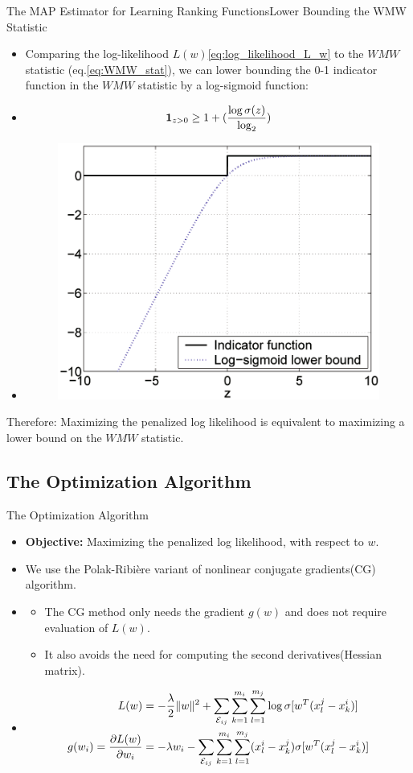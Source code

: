 \documentclass[8pt]{beamer}
\newcommand{\Ytri}{$\triangleright$ }
\renewcommand{\|}[1][.3em]{\hspace{#1}|\hspace{#1}}
\renewcommand{\,}[1][.3em]{,\hspace{#1}}
\newlength{\wideitemsep}
\let\olditem\item
\renewcommand{\item}{\setlength{\itemsep}{\wideitemsep}\olditem}
\newcommand{\subitem}{\item[\Ytri]}
\newcommand{\m}[1]{\mathcal{#1}}
\renewcommand{\,}{,\hspace{3pt}}
\renewcommand{\|}{\hspace{3pt}|\hspace{3pt}}
\newcommand{\pr}[2]{{\partial #1 \over \partial #2}}
\begin{document}
\begin{frame}{The MAP Estimator for Learning Ranking Functions}{Lower Bounding the WMW Statistic}
    \begin{itemize}
    \item Comparing the log-likelihood $L(w)$\ref{eq:log_likelihood_L_w} to the $WMW$ statistic (eq.\ref{eq:WMW_stat}), we can lower bounding the 0-1 indicator function in the $WMW$ statistic by a log-sigmoid function:
    \item[] \begin{equation}
    \textbf{1}_{z > 0} \geq 1 + ({ \log\sigma(z) \over \log_2})
    \end{equation}
    \item[] \begin{figure}
    \centering
    \includegraphics[width=.3\textwidth]{wmw_01_indic_bound}
    \caption[]{}
    \end{figure}
    \end{itemize}
    \begin{block}{Therefore:}\centering
    Maximizing the penalized log likelihood is equivalent to maximizing a lower bound on the $WMW$ statistic.
    \end{block}
\end{frame}

\subsection{The Optimization Algorithm}

\begin{frame}{The Optimization Algorithm}
    \begin{itemize}
    \item \textbf{Objective:} Maximizing the penalized log likelihood, with respect to $w$.
    \item We use the Polak-Ribi\`{e}re variant of nonlinear conjugate gradients(CG) algorithm.
    \item[] \begin{itemize}
        \subitem The CG method only needs the gradient $g(w)$ and does not require evaluation of $L(w)$.
        \subitem It also avoids the need for computing the second derivatives(Hessian matrix).
    \end{itemize}
    \item[] \begin{align}
        L(w) &= -{\lambda \over 2}\lVert w \rVert^2 + \sum_{\m{E}_{ij}}\sum_{k = 1}^{m_i}\sum_{l = 1}^{m_j} \log\sigma[w^T(x_l^j - x_k^i)]\nonumber\\
        g(w_i) = \pr{L(w)}{w_i} &= -\lambda w_i - \sum_{\m{E}_{ij}}\sum_{k = 1}^{m_i}\sum_{l = 1}^{m_j} (x_l^i - x_k^j)\sigma[w^T(x_l^j - x_k^i)]\label{eq:gradient_func}
    \end{align}
    \end{itemize}
\end{frame}
\end{document}
